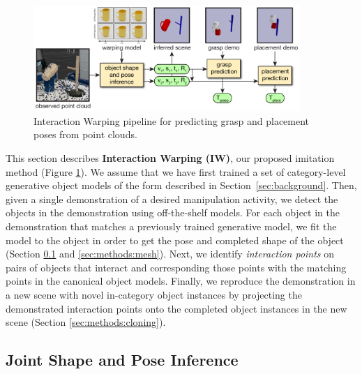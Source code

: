 \documentclass{article}
\begin{document}
\begin{figure}[b!]
    \centering
    \includegraphics[width=0.9\textwidth]{figures/main_figure2.pdf}
    \caption{Interaction Warping pipeline for predicting grasp and placement poses from point clouds.}
    \label{fig:main}
\end{figure}

This section describes \textbf{Interaction Warping (IW)}, our proposed imitation method (Figure \ref{fig:main}). We assume that we have first trained a set of category-level generative object models of the form described in Section~\ref{sec:background}. Then, given a single demonstration of a desired manipulation activity, we detect the objects in the demonstration using off-the-shelf models. For each object in the demonstration that matches a previously trained generative model, we fit the model to the object in order to get the pose and completed shape of the object (Section \ref{sec:methods:scene} and \ref{sec:methods:mesh}).
Next, we identify \emph{interaction points} on pairs of objects that interact and corresponding those points with the matching points in the canonical object models. Finally, we reproduce the demonstration in a new scene with novel in-category object instances by projecting the demonstrated interaction points onto the completed object instances in the new scene (Section \ref{sec:methods:cloning}).

\subsection{Joint Shape and Pose Inference}
\label{sec:methods:scene}
\end{document}
